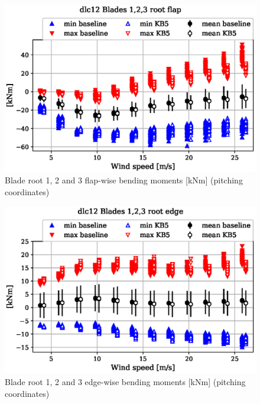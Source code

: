\begin{figure}[!ht]
\begin{center}
	\includegraphics[width=.85\linewidth]{figures/baseline-vs-KB6/dlc12/blade1-blade1-node-001-momentvec-x_AA0008_AA0008.eps}
\end{center}
\caption{Blade root 1, 2 and 3 flap-wise bending moments [kNm] (pitching coordinates)}
\label{fig:baseline-vs-KB6:dlc12:blade-root-flap}
\end{figure}

\begin{figure}[!ht]
\begin{center}
	\includegraphics[width=.85\linewidth]{figures/baseline-vs-KB6/dlc12/blade1-blade1-node-001-momentvec-y_AA0008_AA0008.eps}
\end{center}
\caption{Blade root 1, 2 and 3 edge-wise bending moments [kNm] (pitching coordinates)}
\label{fig:baseline-vs-KB6:dlc12:blade-root-edge}
\end{figure}

